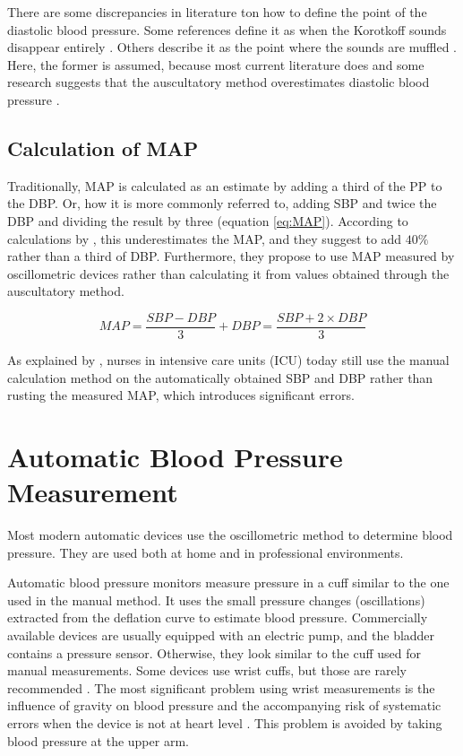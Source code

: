 There are some discrepancies in literature ton how to define the point of the diastolic blood pressure. Some references define it as when the Korotkoff sounds disappear entirely \citep{Lloyd2018, Reeves1995}. Others describe it as the point where the sounds are muffled \citep{Boron2012}. Here, the former is assumed, because most current literature does and some research suggests that the auscultatory method overestimates diastolic blood pressure \citep{Chandrasekhar2019}.

\subsection{Calculation of MAP}
Traditionally, MAP is calculated as an estimate by adding a third of the PP to the DBP. Or, how it is more commonly referred to, adding SBP and twice the DBP and dividing the result by three (equation \ref{eq:MAP}). According to calculations by \cite{Bos2007}, this underestimates the MAP, and they suggest to add $40\%$ rather than a third of DBP. Furthermore, they propose to use MAP measured by oscillometric devices rather than calculating it from values obtained through the auscultatory method. 

\begin{equation}
\label{eq:MAP}
MAP = \frac{SBP-DBP}{3}+DBP = \frac{SBP+2\times DBP}{3}
\end{equation}

As explained by \cite{Joe2019}, nurses in intensive care units (ICU) today still use the manual calculation method on the automatically obtained SBP and DBP rather than rusting the measured MAP, which introduces significant errors.

\section{Automatic Blood Pressure Measurement}
Most modern automatic devices use the oscillometric method to determine blood pressure. They are used both at home and in professional environments.

Automatic blood pressure monitors measure pressure in a cuff similar to the one used in the manual method. It uses the small pressure changes (oscillations) extracted from the deflation curve to estimate blood pressure. Commercially available devices are usually equipped with an electric pump, and the bladder contains a pressure sensor. Otherwise, they look similar to the cuff used for manual measurements. Some devices use wrist cuffs, but those are rarely recommended \citep{BIHS2020}. The most significant problem using wrist measurements is the influence of gravity on blood pressure and the accompanying risk of systematic errors when the device is not at heart level \citep{Boron2012}. This problem is avoided by taking blood pressure at the upper arm.

